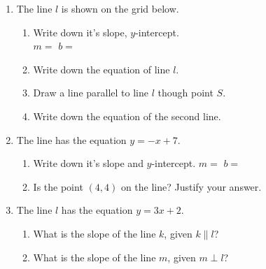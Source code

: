 \begin{enumerate}
\item The line $l$ is shown on the grid below.
\begin{multicols}{2}
\begin{enumerate}
  \item Write down it's slope, $y$-intercept.\\ $m=$
  \hspace{2cm} $b=$
  \vspace{0.25cm}
  \item Write down the equation of line $l$.
  \vspace{1cm}
  \item Draw a line parallel to line $l$ though point $S$.
  \item Write down the equation of the second line.
\end{enumerate}
  \begin{center}
  \end{center}
\end{multicols}\vspace{0.5cm}

\item The line has the equation $y=-x+7$. 
\begin{enumerate}
  \item Write down it's slope and $y$-intercept. \hspace{2cm} $m=$
  \hspace{2cm} $b=$
  \item Is the point $(4, 4)$ on the line? Justify your answer.
\end{enumerate}
\vspace{2cm}

\newpage
\item The line $l$ has the equation $y= 3x+2$.
  \begin{enumerate}
    \item What is the slope of the line $k$, given $k \parallel l$?
    \vspace{1cm}
    \item What is the slope of the line $m$, given $m \perp l$?
    \vspace{1cm}
  \end{enumerate}


\end{enumerate}
